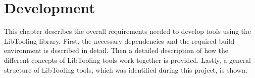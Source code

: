 \chapter{Development}

This chapter describes the overall requirements needed to develop tools using the LibTooling library.
First, the necessary dependencies and the required build environment is described in detail. 
Then a detailed description of how the different concepts of LibTooling tools work together is provided.
Lastly, a general structure of LibTooling tools, which was identified during this project, is shown. 